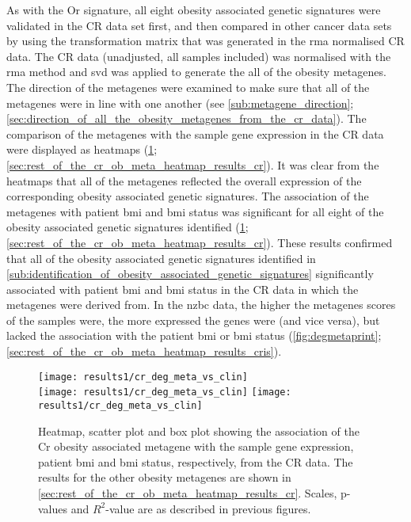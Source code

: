 As with the Or signature, all eight obesity associated genetic signatures were validated in the CR data set first, and then compared in other cancer data sets by using the transformation matrix that was generated in the \gls{rma} normalised CR data.
The CR data (unadjusted, all samples included) was normalised with the \gls{rma} method and \gls{svd} was applied to generate the all of the obesity metagenes.
The direction of the metagenes were examined to make sure that all of the metagenes were in line with one another (see \cref{sub:metagene_direction}; \cref{sec:direction_of_all_the_obesity_metagenes_from_the_cr_data}).
The comparison of the metagenes with the sample gene expression in the CR data were displayed as heatmaps (\cref{fig:degmetacr}; \cref{sec:rest_of_the_cr_ob_meta_heatmap_results_cr}).
It was clear from the heatmaps that all of the metagenes reflected the overall expression of the corresponding obesity associated genetic signatures.
The association of the metagenes with patient \gls{bmi} and \gls{bmi} status was significant for all eight of the obesity associated genetic signatures identified (\cref{fig:degmetacr}; \cref{sec:rest_of_the_cr_ob_meta_heatmap_results_cr}).
These results confirmed that all of the obesity associated genetic signatures identified in \cref{sub:identification_of_obesity_associated_genetic_signatures} significantly associated with patient \gls{bmi} and \gls{bmi} status in the CR data in which the metagenes were derived from.
In the \gls{nzbc} data, the higher the metagenes scores of the samples were, the more expressed the genes were (and vice versa), but lacked the association with the patient \gls{bmi} or \gls{bmi} status (\cref{fig:degmetaprint}; \cref{sec:rest_of_the_cr_ob_meta_heatmap_results_cris}).

\begin{figure}[htp!]
	\centering
	\texttt{[image: results1/cr\_deg\_meta\_vs\_clin]}\\
	\vspace{1em}
	\texttt{[image: results1/cr\_deg\_meta\_vs\_clin]}
	\hfill
	\texttt{[image: results1/cr\_deg\_meta\_vs\_clin]}
	\caption[Cr obesity metagene in the CR data]{Heatmap, scatter plot and box plot showing the association of the Cr obesity associated metagene with the sample gene expression, patient \gls{bmi} and \gls{bmi} status, respectively, from the CR data.
	The results for the other obesity metagenes are shown in \cref{sec:rest_of_the_cr_ob_meta_heatmap_results_cr}.
	Scales, p-values and $R^2$-value are as described in previous figures.}
	\label{fig:degmetacr}
\end{figure}

